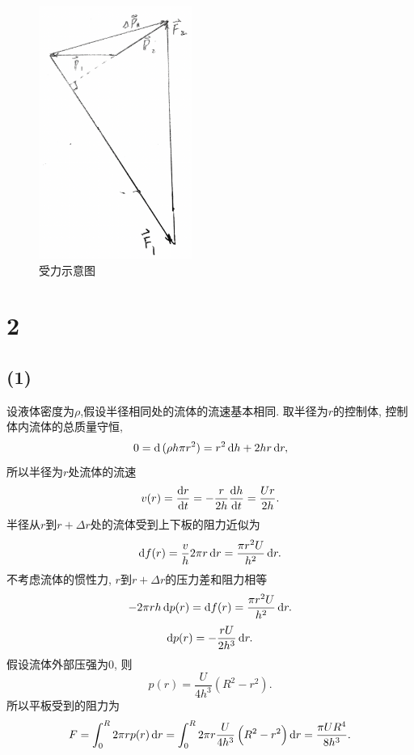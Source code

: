 \documentclass[12pt]{article}
\begin{document}
\begin{figure}[htp]
	\centering
	\includegraphics[width=5cm]{12.png}
	\caption{受力示意图}
	\label{fig:12}
\end{figure}

\section{2}

\subsection{(1)}

设液体密度为$\rho$,假设半径相同处的流体的流速基本相同. 取半径为$r$的控制体, 控制体内流体的总质量守恒,
\begin{equation}
	0 = \dif \ (\rho h \pi r^2) = r^2\dif h + 2hr\dif r,
\end{equation}
所以半径为$r$处流体的流速
\begin{equation}
	v(r) = \frac{\dif r}{\dif t} = - \frac{r}{2h} \frac{\dif h}{\dif t} = \frac{Ur}{2h}.
\end{equation}
半径从$r$到$r+\Delta r$处的流体受到上下板的阻力近似为
\begin{equation}
	\dif f(r) = \frac{v}{h} 2\pi r \dif r = \frac{\pi r^2U}{h^2}\dif r.
\end{equation}
不考虑流体的惯性力, $r$到$r+\Delta r$的压力差和阻力相等
\begin{equation}
	-2\pi rh\dif p(r) = \dif f(r) = \frac{\pi r^2U}{h^2}\dif r.
\end{equation}
\begin{equation}
	\dif p(r) = - \frac{rU}{2h^3}\dif r.
\end{equation}
假设流体外部压强为0, 则
\begin{equation}
	p(r) = \frac{U}{4h^3}\left(R^2-r^2\right).
\end{equation}
所以平板受到的阻力为
\begin{equation}
	F = \int_0^R 2\pi r p(r) \dif r = \int_0^R 2\pi r \frac{U}{4h^3}\left(R^2-r^2\right) \dif r = \frac{\pi U R^4}{8h^3}.
\end{equation}
\end{document}
